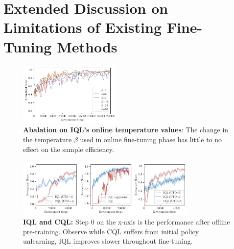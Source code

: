 \section{Extended Discussion on Limitations of Existing Fine-Tuning Methods}
\label{appendix:more_discussion_on_finetuning}

\begin{figure}[h]
\begin{center}
\centerline{\includegraphics[width=0.45\textwidth]{chapters/cal_ql/figs-sample/iql-beta.pdf}}

\caption{\label{fig:beta_ablation}\footnotesize{\textbf{Abalation on IQL's online temperature values}: The change in the temperature $\beta$ used in online fine-tuning phase has little to no effect on the sample efficiency.}}
\end{center}
\vspace{-0.8cm}

\end{figure}

\begin{figure}[h]

\begin{center}
\centerline{\includegraphics[width=0.8\textwidth]{chapters/cal_ql/figs-sample/iql-analysis-final.png}}

\caption{\label{fig:cql_iql_finetune_app}\footnotesize{\textbf{IQL and CQL:} Step 0 on the x-axis is the performance after offline pre-training. Observe while CQL suffers from initial policy unlearning, IQL improves slower throughout fine-tuning.}}

\end{center}
\vspace{-0.9cm}

\end{figure}

